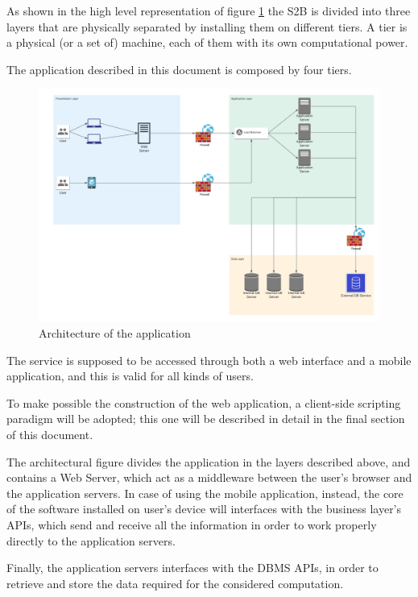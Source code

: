 \documentclass[table, 12pt]{article}
\begin{document}
As shown in the high level representation of figure \ref{three_tier_application} the S2B is divided into three layers that are physically separated by installing them on different tiers. A tier is a physical (or a set of) machine, each of them with its own computational power.

The application described in this document is composed by four tiers.

\begin{figure}[H]
    \includegraphics[width=\textwidth]{assets/Architectural-Design/ApplicationArchitecture.png}
    \caption{Architecture of the application}
    \label{three_tier_application}
\end{figure}

The service is supposed to be accessed through both a web interface and a mobile application, and this is valid for all kinds of users.

To make possible the construction of the web application, a client-side scripting paradigm will be adopted; this one will be described in detail in the final section of this document.

The architectural figure divides the application in the layers described above, and contains a Web Server, which act as a middleware between the user's browser and the application servers.
In case of using the mobile application, instead, the core of the software installed on user's device will interfaces with the business layer's APIs, which send and receive all the information in order to work properly directly to the application servers.

Finally, the application servers interfaces with the DBMS APIs, in order to retrieve and store the data required for the considered computation.
\end{document}
